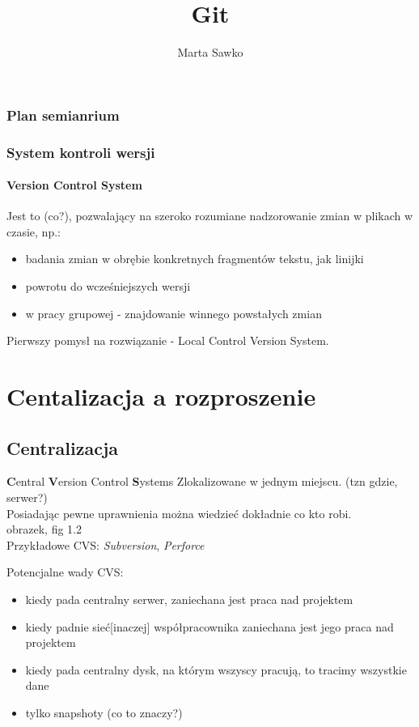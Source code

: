\documentclass{beamer}
\title{Git}
\author{Marta Sawko}
\begin{document}
\frame{\titlepage}

\begin{frame}
 \frametitle{Plan semianrium}
 \tableofcontents
\end{frame}


\begin{frame}
 \frametitle{System kontroli wersji}
 \framesubtitle{\textbf{V}ersion \textbf{C}ontrol \textbf{S}ystem}
 Jest to (co?), pozwalający na szeroko rozumiane nadzorowanie zmian w plikach w czasie, np.:
 \begin{itemize}
  \item badania zmian w obrębie konkretnych fragmentów tekstu, jak linijki
  \item powrotu do wcześniejszych wersji 
  \item w pracy grupowej - znajdowanie winnego powstałych zmian
 \end{itemize} 
 Pierwszy pomysł na rozwiązanie - Local Control Version System.
\end{frame}

\section{Centalizacja a rozproszenie}
\subsection{Centralizacja}
\begin{frame}{\textbf{C}entral \textbf{V}ersion Control \textbf{S}ystems}
  Zlokalizowane w jednym miejscu. (tzn gdzie, serwer?) \\
  Posiadając pewne uprawnienia można wiedzieć dokładnie co kto robi.\\
  obrazek, fig 1.2
  \\ Przykładowe CVS\@: \textit{Subversion}, \textit{Perforce}
\end{frame}

\begin{frame}
  Potencjalne wady CVS:
  \begin{itemize}
  \item kiedy pada centralny serwer, zaniechana jest praca nad projektem
  \item kiedy padnie sieć[inaczej] współpracownika zaniechana jest jego praca nad projektem
  \item kiedy pada centralny dysk, na którym wszyscy pracują, to tracimy wszystkie dane 
  \item tylko snapshoty (co to znaczy?)
 \end{itemize}
\end{frame}
\end{document}
